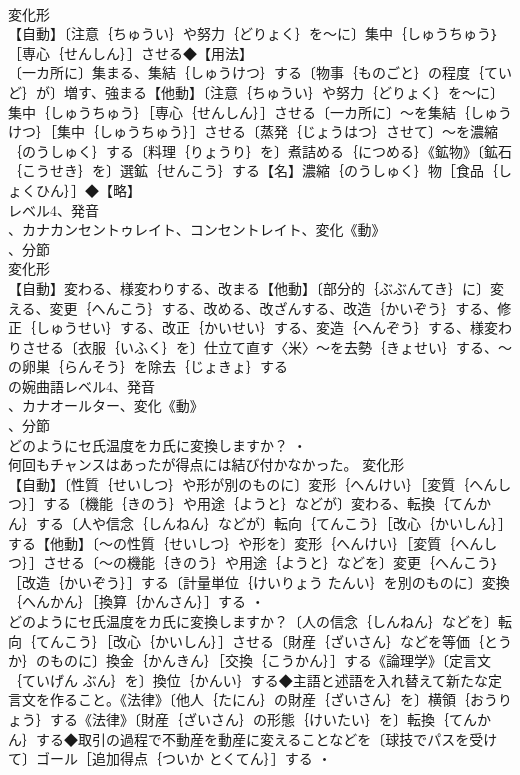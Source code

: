 \documentclass[8pt]{extreport}
\begin{document}
\begin{CJK}{UTF8}{min}
\\	変化形 
\\	【自動】〔注意｛ちゅうい｝や努力｛どりょく｝を～に〕集中｛しゅうちゅう｝［専心｛せんしん｝］させる◆【用法】
\\	〔一カ所に〕集まる、集結｛しゅうけつ｝する〔物事｛ものごと｝の程度｛ていど｝が〕増す、強まる【他動】〔注意｛ちゅうい｝や努力｛どりょく｝を～に〕集中｛しゅうちゅう｝［専心｛せんしん｝］させる〔一カ所に〕～を集結｛しゅうけつ｝［集中｛しゅうちゅう｝］させる〔蒸発｛じょうはつ｝させて〕～を濃縮｛のうしゅく｝する〔料理｛りょうり｝を〕煮詰める｛につめる｝《鉱物》〔鉱石｛こうせき｝を〕選鉱｛せんこう｝する【名】濃縮｛のうしゅく｝物［食品｛しょくひん｝］◆【略】
\\	レベル4、発音
\\	、カナカンセントゥレイト、コンセントレイト、変化《動》
\\	、分節
\\	変化形 
\\	【自動】変わる、様変わりする、改まる【他動】〔部分的｛ぶぶんてき｝に〕変える、変更｛へんこう｝する、改める、改ざんする、改造｛かいぞう｝する、修正｛しゅうせい｝する、改正｛かいせい｝する、変造｛へんぞう｝する、様変わりさせる〔衣服｛いふく｝を〕仕立て直す〈米〉～を去勢｛きょせい｝する、～の卵巣｛らんそう｝を除去｛じょきょ｝する
\\	の婉曲語レベル4、発音
\\	、カナオールター、変化《動》
\\	、分節
\\	どのようにセ氏温度をカ氏に変換しますか？ ・
\\	何回もチャンスはあったが得点には結び付かなかった。	変化形 
\\	【自動】〔性質｛せいしつ｝や形が別のものに〕変形｛へんけい｝［変質｛へんしつ｝］する〔機能｛きのう｝や用途｛ようと｝などが〕変わる、転換｛てんかん｝する〔人や信念｛しんねん｝などが〕転向｛てんこう｝［改心｛かいしん｝］する【他動】〔～の性質｛せいしつ｝や形を〕変形｛へんけい｝［変質｛へんしつ｝］させる〔～の機能｛きのう｝や用途｛ようと｝などを〕変更｛へんこう｝［改造｛かいぞう｝］する〔計量単位｛けいりょう たんい｝を別のものに〕変換｛へんかん｝［換算｛かんさん｝］する ・
\\	どのようにセ氏温度をカ氏に変換しますか？〔人の信念｛しんねん｝などを〕転向｛てんこう｝［改心｛かいしん｝］させる〔財産｛ざいさん｝などを等価｛とうか｝のものに〕換金｛かんきん｝［交換｛こうかん｝］する《論理学》〔定言文｛ていげん ぶん｝を〕換位｛かんい｝する◆主語と述語を入れ替えて新たな定言文を作ること。《法律》〔他人｛たにん｝の財産｛ざいさん｝を〕横領｛おうりょう｝する《法律》〔財産｛ざいさん｝の形態｛けいたい｝を〕転換｛てんかん｝する◆取引の過程で不動産を動産に変えることなどを〔球技でパスを受けて〕ゴール［追加得点｛ついか とくてん｝］する ・

\end{CJK}
\end{document}
